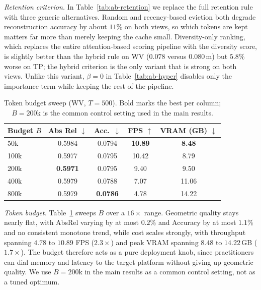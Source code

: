 \textit{Retention criterion.}
In Table~\ref{tab:ab-retention} we replace the full retention rule with three generic alternatives. Random and recency-based eviction both degrade reconstruction accuracy by about $11$\% on both views, so which tokens are kept matters far more than merely keeping the cache small. Diversity-only ranking, which replaces the entire attention-based scoring pipeline with the diversity score, is slightly better than the hybrid rule on WV ($0.078$ versus $0.080$\,m) but $5.8$\% worse on TP; the hybrid criterion is the only variant that is strong on both views. Unlike this variant, $\beta{=}0$ in Table~\ref{tab:ab-hyper} disables only the importance term while keeping the rest of the pipeline.

\begin{table}[t]
    \centering
    \caption{Token budget sweep (WV, $T{=}500$). Bold marks the best per column; $B{=}200\mathrm{k}$ is the common control setting used in the main results.}
    \label{tab:ab-budget}
    \tabletext
    \setlength{\tabcolsep}{4pt}
    \begin{tabular}{lcccc}
        \toprule
        Budget $B$ & Abs Rel $\downarrow$ & Acc.\ $\downarrow$ & FPS $\uparrow$ & VRAM (GB) $\downarrow$ \\
        \midrule
        50k  & 0.5984 & 0.0794 & \textbf{10.89} & \textbf{8.48} \\
        100k & 0.5977 & 0.0795 & 10.42 & 8.79 \\
        200k & \textbf{0.5971} & 0.0795 & 9.40 & 9.50 \\
        400k & 0.5979 & 0.0788 & 7.07 & 11.06 \\
        800k & 0.5979 & \textbf{0.0786} & 4.78 & 14.22 \\
        \bottomrule
    \end{tabular}
\end{table}

\textit{Token budget.}
Table~\ref{tab:ab-budget} sweeps $B$ over a $16\times$ range. Geometric quality stays nearly flat, with AbsRel varying by at most $0.2$\% and Accuracy by at most $1.1$\% and no consistent monotone trend, while cost scales strongly, with throughput spanning $4.78$ to $10.89$ FPS ($2.3\times$) and peak VRAM spanning $8.48$ to $14.22$\,GB ($1.7\times$). The budget therefore acts as a pure deployment knob, since practitioners can dial memory and latency to the target platform without giving up geometric quality. We use $B{=}200\mathrm{k}$ in the main results as a common control setting, not as a tuned optimum.

